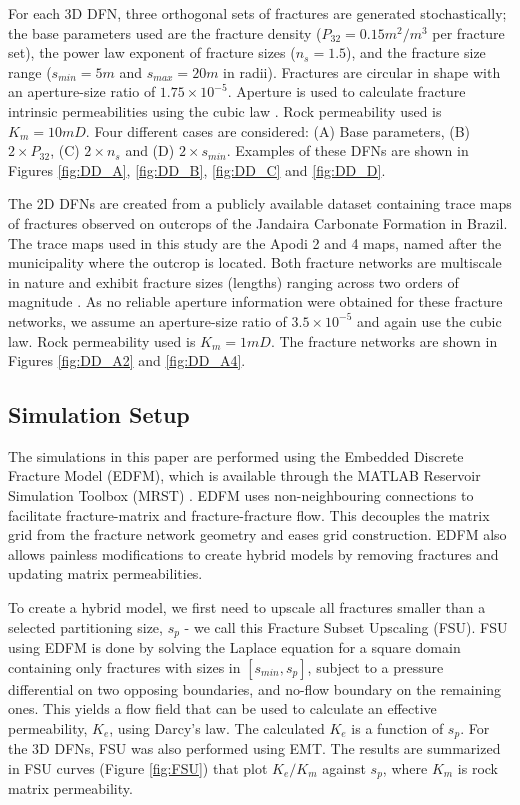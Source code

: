 \documentclass[a4paper]{article}
\begin{document}
For each 3D DFN, three orthogonal sets of fractures are generated stochastically; the base parameters used are the fracture density ($P_{32}=0.15m^2/m^3$ per fracture set), the power law exponent of fracture sizes ($n_s=1.5$), and the fracture size range ($s_{min}=5m$ and $s_{max}=20m$ in radii). Fractures are circular in shape with an aperture-size ratio of $1.75\times 10^{-5}$. Aperture is used to calculate fracture intrinsic permeabilities using the cubic law \citep{Witherspoon1980}. Rock permeability used is $K_m=10mD$. Four different cases are considered: (A) Base parameters, (B) $2\times P_{32}$, (C) $2\times n_s$ and (D) $2\times s_{min}$. Examples of these DFNs are shown in Figures \ref{fig:DD_A}, \ref{fig:DD_B}, \ref{fig:DD_C} and \ref{fig:DD_D}.

The 2D DFNs are created from a publicly available dataset containing trace maps of fractures observed on outcrops of the Jandaira Carbonate Formation in Brazil. The trace maps used in this study are the Apodi 2 and 4 maps, named after the municipality where the outcrop is located. Both fracture networks are multiscale in nature and exhibit fracture sizes (lengths) ranging across two orders of magnitude \citep{Bisdom2017}. As no reliable aperture information were obtained for these fracture networks, we assume an aperture-size ratio of $3.5\times 10^{-5}$ and again use the cubic law. Rock permeability used is $K_m=1mD$. The fracture networks are shown in Figures \ref{fig:DD_A2} and \ref{fig:DD_A4}.


\subsection{Simulation Setup}
The simulations in this paper are performed using the Embedded Discrete Fracture Model (EDFM), which is available through the MATLAB Reservoir Simulation Toolbox (MRST) \citep{Lee2001, Lie2015, Moinfar2013}. EDFM uses non-neighbouring connections to facilitate fracture-matrix and fracture-fracture flow. This decouples the matrix grid from the fracture network geometry and eases grid construction. EDFM also allows painless modifications to create hybrid models by removing fractures and updating matrix permeabilities.

To create a hybrid model, we first need to upscale all fractures smaller than a selected partitioning size, $s_p$ - we call this Fracture Subset Upscaling (FSU). FSU using EDFM is done by solving the Laplace equation for a square domain containing only fractures with sizes in $[s_{min},s_p]$, subject to a pressure differential on two opposing boundaries, and no-flow boundary on the remaining ones. This yields a flow field that can be used to calculate an effective permeability, $K_{e}$, using Darcy's law. The calculated $K_{e}$ is a function of $s_p$. For the 3D DFNs, FSU was also performed using EMT. The results are summarized in FSU curves (Figure \ref{fig:FSU}) that plot $K_{e}/K_m$ against $s_p$, where $K_m$ is rock matrix permeability.
\end{document}
